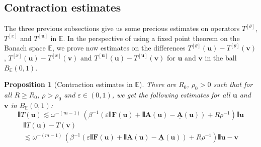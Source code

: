 \documentclass[10pt]{amsart}
\newtheorem{prop}[cdrthm]{Proposition}
\theoremstyle{definition}
\theoremstyle{plain}
\newcommand*\e{\varepsilon}
\newcommand*\EE{{\mathbb E}}
\newcommand{\ubf}{{\mathbf u}}
\newcommand{\vbf}{{\mathbf v}}
\newcommand*\A{{\mathbf A}}
\newcommand*\F{{\mathbf F}}
\newcommand*\und{\underline}
\DeclarePairedDelimiter{\VERT}{|\mkern -1.6mu|\mkern -1.6mu|}{|\mkern -1.6mu|\mkern -1.6mu|}
\begin{document}
\subsection{Contraction estimates}



The three previous subsections give us some precious estimates on operators $T^{[\theta]}$, $T^{[x]}$ and $T^{[\ubf]}$ in $\EE$. In the perspective of using a fixed point theorem on the Banach space $\EE$, we prove now estimates on the differences $T^{[\theta]}(\ubf) - T^{[\theta]}(\vbf)$, $T^{[x]}(\ubf) - T^{[x]}(\vbf)$ and $T^{[\ubf]}(\ubf) - T^{[\ubf]}(\vbf)$ for $\ubf$ and $\vbf$ in the ball $B_{\EE}(0,1)$.

\begin{prop}[Contraction estimates in $\EE$]\label{1.prop.estimates}
There are $R_0$, $\rho_0>0$ such that for all $R\geq R_0$, $\rho>\rho_0$ and $\e \in (0,1)$, we get the following estimates for all $\ubf$ and $\vbf$ in $B_{\EE}(0,1)$:
\begin{equation}\label{1.esti.T}
\VERT{T(\ubf)} \lesssim \omega^{-(m-1)}\,\left(\beta^{-1} \left(\e\VERT{\F(\ubf)} + \VERT{\mathbf{A}(\ubf) - \und{\A}(\ubf)} \right) + R\rho^{-1}\right) \VERT{\ubf} 
\end{equation}
\begin{multline}\label{1.esti.TT}
\VERT{T(\ubf) - T(\vbf)} \\
\lesssim \omega^{-(m-1)}\,\left(\beta^{-1} \left(\e \VERT{\F(\ubf)} + \VERT{\mathbf{A}(\ubf) - \und{\A}(\ubf)} \right) + R\rho^{-1}\right) \VERT{\ubf - \vbf}
\end{multline}
\end{prop}
\end{document}
